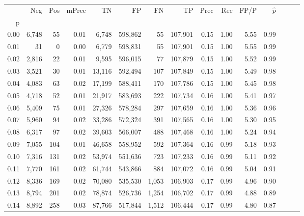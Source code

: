 \begin{tabular}{rrrrrrrrrrrrrrr}
\toprule
{} &     Neg &    Pos & mPrec &       TN &       FP &       FN &       TP &  Prec &   Rec &  FP/P & $\hat{p}$ \\
p    &         &        &       &          &          &          &          &       &       &       &           \\
\midrule
0.00 &   6,748 &     55 &  0.01 &    6,748 &  598,862 &       55 &  107,901 &  0.15 &  1.00 &  5.55 &      0.99 \\
0.01 &      31 &      0 &  0.00 &    6,779 &  598,831 &       55 &  107,901 &  0.15 &  1.00 &  5.55 &      0.99 \\
0.02 &   2,816 &     22 &  0.01 &    9,595 &  596,015 &       77 &  107,879 &  0.15 &  1.00 &  5.52 &      0.99 \\
0.03 &   3,521 &     30 &  0.01 &   13,116 &  592,494 &      107 &  107,849 &  0.15 &  1.00 &  5.49 &      0.98 \\
0.04 &   4,083 &     63 &  0.02 &   17,199 &  588,411 &      170 &  107,786 &  0.15 &  1.00 &  5.45 &      0.98 \\
0.05 &   4,718 &     52 &  0.01 &   21,917 &  583,693 &      222 &  107,734 &  0.16 &  1.00 &  5.41 &      0.97 \\
0.06 &   5,409 &     75 &  0.01 &   27,326 &  578,284 &      297 &  107,659 &  0.16 &  1.00 &  5.36 &      0.96 \\
0.07 &   5,960 &     94 &  0.02 &   33,286 &  572,324 &      391 &  107,565 &  0.16 &  1.00 &  5.30 &      0.95 \\
0.08 &   6,317 &     97 &  0.02 &   39,603 &  566,007 &      488 &  107,468 &  0.16 &  1.00 &  5.24 &      0.94 \\
0.09 &   7,055 &    104 &  0.01 &   46,658 &  558,952 &      592 &  107,364 &  0.16 &  0.99 &  5.18 &      0.93 \\
0.10 &   7,316 &    131 &  0.02 &   53,974 &  551,636 &      723 &  107,233 &  0.16 &  0.99 &  5.11 &      0.92 \\
0.11 &   7,770 &    161 &  0.02 &   61,744 &  543,866 &      884 &  107,072 &  0.16 &  0.99 &  5.04 &      0.91 \\
0.12 &   8,336 &    169 &  0.02 &   70,080 &  535,530 &    1,053 &  106,903 &  0.17 &  0.99 &  4.96 &      0.90 \\
0.13 &   8,794 &    201 &  0.02 &   78,874 &  526,736 &    1,254 &  106,702 &  0.17 &  0.99 &  4.88 &      0.89 \\
0.14 &   8,892 &    258 &  0.03 &   87,766 &  517,844 &    1,512 &  106,444 &  0.17 &  0.99 &  4.80 &      0.87 \\

\end{tabular}
